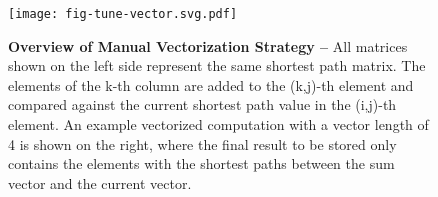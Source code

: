 
\begin{figure}[h]

  \centering
  \texttt{[image: fig-tune-vector.svg.pdf]}

  \caption{\textbf{Overview of Manual Vectorization Strategy --} All
    matrices shown on the left side represent the same shortest path
    matrix. The elements of the k-th column are added to the (k,j)-th
    element and compared against the current shortest path value in the
    (i,j)-th element. An example vectorized computation with a vector
    length of 4 is shown on the right, where the final result to be
    stored only contains the elements with the shortest paths between the
    sum vector and the current vector. }

  \label{fig-alternative-overview}

\end{figure}
